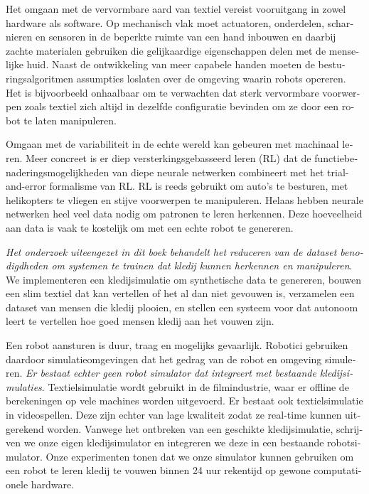 \documentclass[\home/main.tex]{subfiles}
\begin{document}
\begin{otherlanguage}{dutch}
Het omgaan met de vervormbare aard van textiel vereist vooruitgang in zowel hardware als software. 
Op mechanisch vlak moet actuatoren, onderdelen, scharnieren en sensoren in de beperkte ruimte van een hand inbouwen en daarbij zachte materialen gebruiken die gelijkaardige eigenschappen delen met de menselijke huid. Naast de ontwikkeling van meer capabele handen moeten de besturingsalgoritmen assumpties loslaten over de omgeving waarin robots opereren. Het is bijvoorbeeld onhaalbaar om te verwachten dat sterk vervormbare voorwerpen zoals textiel zich altijd in dezelfde configuratie bevinden om ze door een robot te laten manipuleren.

Omgaan met de variabiliteit in de echte wereld kan gebeuren met machinaal leren. Meer concreet is er diep versterkingsgebasseerd leren (RL) dat de functiebenaderingsmogelijkheden van diepe neurale netwerken combineert met het trial-and-error formalisme van \gls{RL}. RL is reeds gebruikt om auto's te besturen, met helikopters te vliegen en stijve voorwerpen te manipuleren. Helaas hebben neurale netwerken heel veel data nodig om patronen te leren herkennen. Deze hoeveelheid aan data is vaak te kostelijk om met een echte robot te genereren.

\emph{Het onderzoek uiteengezet in dit boek behandelt het reduceren van de dataset benodigdheden om systemen te trainen dat kledij kunnen herkennen en manipuleren}.
We implementeren een kledijsimulatie om synthetische data te genereren, bouwen een slim textiel dat kan vertellen of het al dan niet gevouwen is, verzamelen een dataset van mensen die kledij plooien, en stellen een systeem voor dat autonoom leert te vertellen hoe goed mensen kledij aan het vouwen zijn.

Een robot aansturen is duur, traag en mogelijks gevaarlijk. Robotici gebruiken daardoor simulatieomgevingen dat het gedrag van de robot en omgeving simuleren. \emph{Er bestaat echter geen robot simulator dat integreert met bestaande kledijsimulaties}. Textielsimulatie wordt gebruikt in de filmindustrie, waar er offline de berekeningen op vele machines worden uitgevoerd. Er bestaat ook textielsimulatie in videospellen. Deze zijn echter van lage kwaliteit zodat ze real-time kunnen uitgerekend worden. Vanwege het ontbreken van een geschikte kledijsimulatie, schrijven we onze eigen kledijsimulator en integreren we deze in een bestaande robotsimulator. Onze experimenten tonen dat we onze simulator kunnen gebruiken om een robot te leren kledij te vouwen binnen 24 uur rekentijd op gewone computationele hardware. 


\end{otherlanguage}
\end{document}
